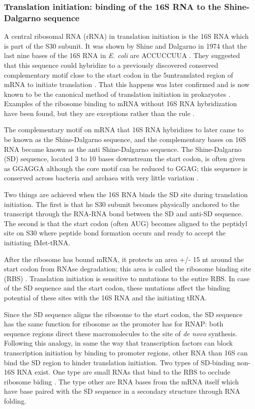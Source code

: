 \subsubsection{Translation initiation: binding of the 16S RNA to the
Shine-Dalgarno sequence} A central ribosomal RNA (rRNA) in translation
initiation is the 16S RNA which is part of the S30 subunit. It was shown by
Shine and Dalgarno in 1974 that the last nine bases of the 16S RNA in
\textit{E. coli} are ACCUCCUUA \cite{shine_3-terminal_1974}. They suggested
that this sequence could hybridize to a previously discovered conserved
complementary motif close to the start codon in the 5\p untranslated region of
mRNA to initiate translation \cite{shine_3-terminal_1974}. That this happens
was later confirmed and is now known to be the canonical method of translation
initiation in prokaryotes \cite{nakagawa_dynamic_2010}. Examples of the
ribosome binding to mRNA without 16S RNA hybridization have been found, but
they are exceptions rather than the rule \cite{skorski_highly_2006,
boni_non-canonical_2001}.

The complementary motif on mRNA that 16S RNA hybridizes to later came to be
known as the Shine-Dalgarno sequence, and the complementary bases on 16S RNA
became known as the anti Shine-Dalgarno sequence. The Shine-Dalgarno (SD)
sequence, located 3 to 10 bases downstream the start codon, is often given as
GGAGGA although the core motif can be reduced to GGAG; this sequence is
conserved across bacteria and archaea with very little variation
\cite{nakagawa_dynamic_2010}.

Two things are achieved when the 16S RNA binds the SD site during translation
initiation. The first is that he S30 subunit becomes physically anchored to the
transcript through the RNA-RNA bond between the SD and anti-SD sequence. The
second is that the start codon (often AUG) becomes aligned to the peptidyl site
on S30 where peptide bond formation occurs and ready to accept the initiating
fMet-tRNA.

After the ribosome has bound mRNA, it protects an area +/- 15 nt around the
start codon from RNAse degradation; this area is called the ribosome binding
site (RBS) \cite{kozak_regulation_2005}. Translation initiation is sensitive to
mutations to the entire RBS. In case of the SD sequence and the start codon,
these mutations affect the binding potential of these sites with the 16S RNA
and the initiating tRNA.

Since the SD sequence aligns the ribosome to the start codon, the SD sequence
has the same function for ribosome as the promoter has for RNAP: both sequence
regions direct these macromolecules to the site of \textit{de novo} synthesis.
Following this analogy, in same the way that transcription factors can block
transcription initiation by binding to promoter regions, other RNA than 16S can
bind the SD region to hinder translation initiation. Two types of SD-binding
non-16S RNA exist. One type are small RNAs that bind to the RBS to occlude
ribosome biding \cite{storz_controlling_2004}. The type other are RNA bases
from the mRNA itself which have base paired with the SD sequence in a secondary
structure through RNA folding.

